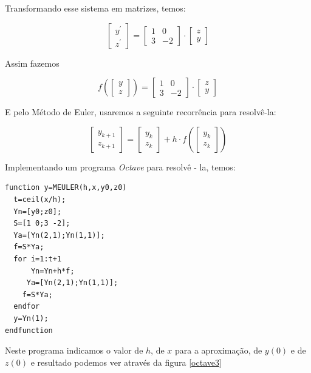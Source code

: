 \documentclass[11pt, openright, a4paper, brazil, openany, oneside]{abntex2}
\begin{document}
Transformando esse sistema em matrizes, temos:

$$
\left[ \begin{array}{c}
y^{'}\\
z^{'}
\end{array} \right] =
\left[\begin{array}{cc}
1 & 0\\
3 & -2
\end{array}\right]\cdot
\left[\begin{array}{c}
z\\
y
\end{array}\right]
$$

Assim fazemos

$$
f\left(\left[ \begin{array}{c}
y\\
z
\end{array} \right]\right) =
\left[\begin{array}{cc}
1 & 0\\
3 & -2
\end{array}\right]\cdot
\left[\begin{array}{c}
z\\
y
\end{array}\right]
$$

E pelo Método de Euler, usaremos a seguinte recorrência para resolvê-la:

$$
\left[
\begin{array}{c}
y_{k+1}\\
z_{k+1}

\end{array}\right] =
\left[
\begin{array}{c}
y_{k}\\
z_{k}
\end{array}\right] + h\cdot
f\left(\left[
\begin{array}{c}
y_{k}\\
z_{k}
\end{array}\right]\right)
$$

\newpage

Implementando um programa \textit{Octave} para resolvê - la, temos:

\begin{verbatim}
function y=MEULER(h,x,y0,z0)
  t=ceil(x/h);
  Yn=[y0;z0];
  S=[1 0;3 -2];
  Ya=[Yn(2,1);Yn(1,1)];
  f=S*Ya;
  for i=1:t+1
      Yn=Yn+h*f;
     Ya=[Yn(2,1);Yn(1,1)];
    f=S*Ya;
  endfor
  y=Yn(1);
endfunction
\end{verbatim}

Neste programa indicamos o valor de $h$, de $x$ para a aproximação, de $y(0)$ e de $z(0)$ e resultado podemos ver através da figura \ref{octave3}
\end{document}
